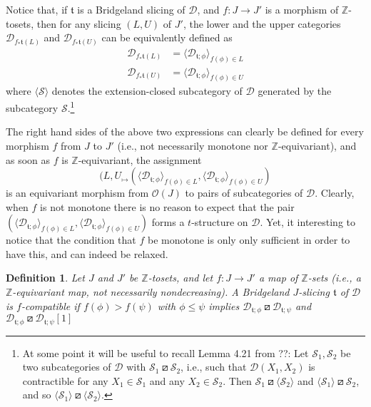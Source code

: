 \documentclass{article}
\newtheorem{defn}[thm]{Definition}
\theoremstyle{definition}
\newcommand{\Z}{\mathbb{Z}}
\newcommand{\tee}{\mathfrak{t}}
\newcommand{\orth}{\boxslash}
\begin{document}
Notice that, if $\tee$ is a Bridgeland slicing of $\mathscr{D}$, and $f\colon J\to J'$ is a morphism of $\Z$-tosets, then for any slicing $(L,U)$ of $J'$, the lower and the upper categories
$\mathscr{D}_{f_*\tee(L)}$ and $\mathscr{D}_{f_*\tee(U)}$ can be equivalently defined as
\begin{align*}
\mathscr{D}_{f_*\tee(L)}&=\langle \mathscr{D}_{\tee;\phi}\rangle_{f(\phi)\in L}\\
\mathscr{D}_{f_*\tee(U)}&=\langle \mathscr{D}_{\tee;\phi}\rangle_{f(\phi)\in U}
\end{align*}
where $\langle \mathscr{S}\rangle$ denotes the extension-closed subcategory of $\mathscr{D}$ generated by the subcategory $\mathscr{S}$.\footnote{
At some point it will be useful to recall Lemma 4.21 from ??:
Let $\mathscr{S}_1,\mathscr{S}_2$ be two subcategories of $\mathscr{D}$ with $\mathscr{S}_1\orth \mathscr{S}_2$, i.e., such that $\mathscr{D}(X_1,X_2)$ is contractible for any $X_1\in \mathscr{S}_1$ and any $X_2\in\mathscr{S}_2$. Then $\mathscr{S}_1\orth \langle\mathscr{S}_2\rangle$ and $\langle\mathscr{S}_1\rangle\orth \mathscr{S}_2$, and so $\langle\mathscr{S}_1\rangle\orth \langle\mathscr{S}_2\rangle$.}

The right hand sides of the above two expressions can clearly be defined for every morphism $f$ from $J$ to $J'$ (i.e., not necessarily monotone nor $\Z$-equivariant), and as soon as $f$ is $\Z$-equivariant, the assignment
\[
(L,U_\mapsto (\langle \mathscr{D}_{\tee;\phi}\rangle_{f(\phi)\in L},\langle \mathscr{D}_{\tee;\phi}\rangle_{f(\phi)\in U})
\]
is an equivariant morphism from $\mathcal{O}(J)$ to pairs of subcategories of $\mathscr{D}$. Clearly, when $f$ is not monotone there is no reason to expect that the pair $(\langle \mathscr{D}_{\tee;\phi}\rangle_{f(\phi)\in L},\langle \mathscr{D}_{\tee;\phi}\rangle_{f(\phi)\in U})$ forms a $t$-structure on $\mathscr{D}$. Yet, it interesting to notice that the condition that $f$ be monotone is only only sufficient in order to have this, and can indeed be relaxed.

\begin{defn}
Let $J$ and $J'$ be $\Z$-tosets, and let $f\colon J\to J'$ a map of $\Z$-sets (i.e., a $\Z$-equivariant map, not necessarily nondecreasing). A Bridgeland $J$-slicing $\tee$ of $\mathscr{D}$ is \emph{$f$-compatible}
if $f(\phi)>f(\psi)$ with $\phi\leq \psi$ implies $\mathscr{D}_{\tee; \phi}\orth \mathscr{D}_{\tee;\psi}$ and $\mathscr{D}_{\tee; \phi}\orth \mathscr{D}_{\tee;\psi}[1]$
\end{defn}
\end{document}
